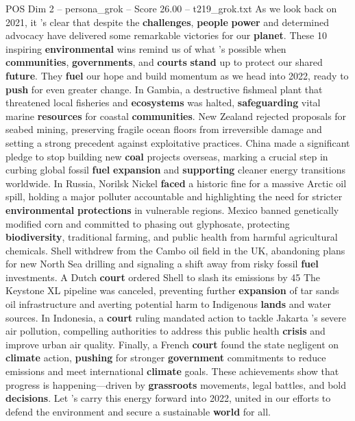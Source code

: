 \begin{textsample}{POS Dim 2 – persona\_grok – Score 26.00 – t219\_grok.txt}  \label{ex:f2_pos_036}
As we look back on 2021, it 's clear that despite the \textbf{challenges}, \textbf{people} \textbf{power} and determined advocacy have delivered some remarkable victories for our \textbf{planet}.
These 10 inspiring \textbf{environmental} wins remind us of what 's possible when \textbf{communities}, \textbf{governments}, and \textbf{courts} \textbf{stand} up to protect our shared \textbf{future}.
They \textbf{fuel} our hope and build momentum as we head into 2022, ready to \textbf{push} for even greater change.
In Gambia, a destructive fishmeal plant that threatened local fisheries and \textbf{ecosystems} was halted, \textbf{safeguarding} vital marine \textbf{resources} for coastal \textbf{communities}.
New Zealand rejected proposals for seabed mining, preserving fragile ocean floors from irreversible damage and setting a strong precedent against exploitative practices.
China made a significant pledge to stop building new \textbf{coal} projects overseas, marking a crucial step in curbing global fossil \textbf{fuel} \textbf{expansion} and \textbf{supporting} cleaner energy transitions worldwide.
In Russia, Norilsk Nickel \textbf{faced} a historic fine for a massive Arctic oil spill, holding a major polluter accountable and highlighting the need for stricter \textbf{environmental} \textbf{protections} in vulnerable regions.
Mexico banned genetically modified corn and committed to phasing out glyphosate, protecting \textbf{biodiversity}, traditional farming, and public health from harmful agricultural chemicals.
Shell withdrew from the Cambo oil field in the UK, abandoning plans for new North Sea drilling and signaling a shift away from risky fossil \textbf{fuel} investments.
A Dutch \textbf{court} ordered Shell to slash its emissions by 45 %
The Keystone XL pipeline was canceled, preventing further \textbf{expansion} of tar sands oil infrastructure and averting potential harm to Indigenous \textbf{lands} and water sources.
In Indonesia, a \textbf{court} ruling mandated action to tackle Jakarta 's severe air pollution, compelling authorities to address this public health \textbf{crisis} and improve urban air quality.
Finally, a French \textbf{court} found the state negligent on \textbf{climate} action, \textbf{pushing} for stronger \textbf{government} commitments to reduce emissions and meet international \textbf{climate} goals.
These achievements show that progress is happening—driven by \textbf{grassroots} movements, legal battles, and bold \textbf{decisions}.
Let 's carry this energy forward into 2022, united in our efforts to defend the environment and secure a sustainable \textbf{world} for all.

\end{textsample}
